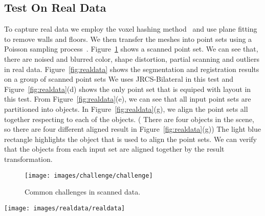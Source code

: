 \subsection{Test On Real Data}
To capture real data we employ the voxel hashing method~\cite{VXH} and use plane fitting to remove walls and floors. 
%
We then transfer the meshes into point sets using a Poisson sampling process~\cite{PossionSampling}.
%
Figure~\ref{fig:challenge} shows a scanned point set. We can see that, there are noised and blurred color, shape distortion, partial scanning and outliers in real data.
%
Figure~\ref{fig:realdata} shows the segmentation and registration results on a group of scanned point sets We uses JRCS-Bilateral in this test and Figure~\ref{fig:realdata}(d) shows the only point set that is equiped with layout in this test.
From Figure~\ref{fig:realdata}(e), we can see that all input point sets are partitioned into objects. In Figure~\ref{fig:realdata}(g), we align the point sets all together respecting to each of the objects. ( There are four objects in the scene, so there are four different aligned result in Figure~\ref{fig:realdata}(g)) The light blue rectangle highlights the object that is used to align the point sets. We can verify that the objects from each input set are aligned together by the result transformation.
\begin{figure}
	\centering
	\texttt{[image: images/challenge/challenge]}
	\caption{\label{fig:challenge}Common challenges in scanned data.}
\end{figure}
\begin{figure*}
	\centering
	\texttt{[image: images/realdata/realdata]}
	\caption{\label{fig:realdata} Segmentation and registration on real data. (a) Scanned mesh using method in \cite{VXH}. (b) Remove walls and floors by plane fitting. (c) Sampled point set using \cite{PossionSampling}. (d) With roughly placed boxes on only one point set, the points are initially segmented in this one point set. Note that parts of the chair legs are segmented to the table due to the rough box placement by users. (e) Pairs of input point sets and corresponding segmentation results. (f) The final Gaussian centroids for the five objects in the scene. (g) Verification of the registration result by aligning all point sets with respect to each object. The light blue rectangle highlights the object that is aligned together. Except the aligned object, the other objects are placed quite messy since they came from different point sets and have different arrangement relative to the aligned object. %
	}
\end{figure*} 
